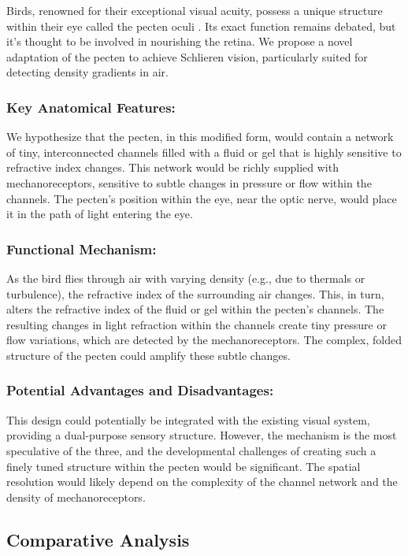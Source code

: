 \documentclass[11pt]{article}
\begin{document}
Birds, renowned for their exceptional visual acuity, possess a unique structure within their eye called the pecten oculi \cite{Meyer1977AvianEye}. Its exact function remains debated, but it's thought to be involved in nourishing the retina. We propose a novel adaptation of the pecten to achieve Schlieren vision, particularly suited for detecting density gradients in air.

\subsubsection{Key Anatomical Features:}
We hypothesize that the pecten, in this modified form, would contain a network of tiny, interconnected channels filled with a fluid or gel that is highly sensitive to refractive index changes. This network would be richly supplied with mechanoreceptors, sensitive to subtle changes in pressure or flow within the channels. The pecten's position within the eye, near the optic nerve, would place it in the path of light entering the eye.

\subsubsection{Functional Mechanism:}
As the bird flies through air with varying density (e.g., due to thermals or turbulence), the refractive index of the surrounding air changes. This, in turn, alters the refractive index of the fluid or gel within the pecten's channels. The resulting changes in light refraction within the channels create tiny pressure or flow variations, which are detected by the mechanoreceptors. The complex, folded structure of the pecten could amplify these subtle changes.

\subsubsection{Potential Advantages and Disadvantages:}
This design could potentially be integrated with the existing visual system, providing a dual-purpose sensory structure. However, the mechanism is the most speculative of the three, and the developmental challenges of creating such a finely tuned structure within the pecten would be significant. The spatial resolution would likely depend on the complexity of the channel network and the density of mechanoreceptors.

\subsection{Comparative Analysis}
\end{document}
